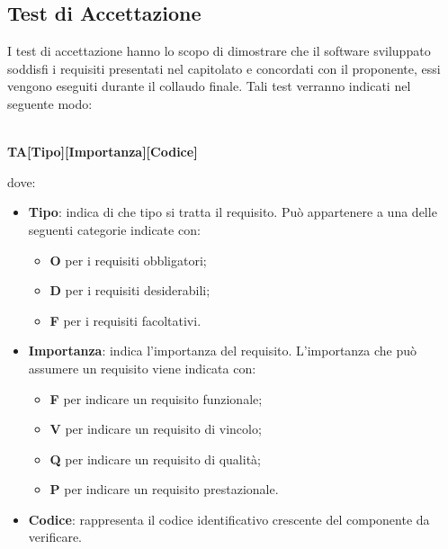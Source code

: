 \subsection{Test di Accettazione}
I test di accettazione hanno lo scopo di dimostrare che il software sviluppato 
soddisfi i requisiti presentati nel capitolato e concordati con il proponente, essi vengono eseguiti durante il
collaudo finale. Tali test verranno indicati nel seguente modo: \\ \\
	\centerline{\textbf{TA[Tipo][Importanza][Codice]}}
dove:
\begin{itemize}
	\item \textbf{Tipo}: indica di che tipo si tratta il requisito. Può
		appartenere a una delle seguenti categorie indicate con:
		\begin{itemize}
			\item \textbf{O} per i requisiti obbligatori;
			\item \textbf{D} per i requisiti desiderabili;
			\item \textbf{F} per i requisiti facoltativi.			
		\end{itemize}
	\item \textbf{Importanza}: indica l'importanza del requisito. L'importanza
		che può assumere un requisito viene indicata con:
		\begin{itemize}
			\item \textbf{F} per indicare un requisito funzionale;
			\item \textbf{V} per indicare un requisito di vincolo;
			\item \textbf{Q} per indicare un requisito di qualità;
			\item \textbf{P} per indicare un requisito prestazionale. 
		\end{itemize}
	\item \textbf{Codice}: rappresenta il codice identificativo crescente
		del componente da verificare.
\end{itemize}

	\renewcommand{\arraystretch}{1.5}
	
